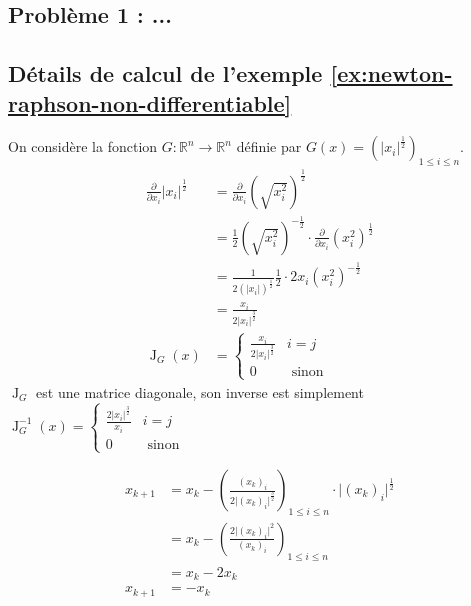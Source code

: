 \documentclass[3p, twocolumn]{elsarticle}
\DeclareMathOperator{\Jacobian}{J}
\begin{document}
\subsection{Problème 1 : ...}
\cleardoublepage
\begin{appendices}
    \section{Détails de calcul de l'exemple \ref{ex:newton-raphson-non-differentiable}}
    \label{ap:calcul-exemple-nr}
    On considère la fonction $G:\mathbb R^n\rightarrow \mathbb R^n$ définie par $G(x)=\left(\lvert x_i\rvert^{\frac12}\right)_{1\leq i\leq n}$.
    \begin{align*}
        \frac{\partial}{\partial x_i}\lvert x_i\rvert^{\frac12} & = \frac{\partial}{\partial x_i}\left(\sqrt{x_i^2}\right)^{\frac12}                                          \\
                                                                & = \frac12\left(\sqrt{x_i^2}\right)^{-\frac12}\cdot\frac{\partial}{\partial x_i}\left(x_i^2\right)^{\frac12} \\
                                                                & = \frac1{2(\lvert x_i\rvert)^{\frac12}}\frac12\cdot2x_i(x_i^2)^{-\frac12}                                   \\
                                                                & = \frac{x_i}{2\lvert x_i\rvert^{\frac32}}                                                                   \\
        \Jacobian_G(x)                                          & = \begin{cases}
            \frac{x_i}{2\lvert x_i\rvert^{\frac32}} & i=j             \\
            0                                       & \textrm{ sinon}
        \end{cases}
    \end{align*}
    $\Jacobian_G$ est une matrice diagonale, son inverse est simplement $\Jacobian^{-1}_G(x)=\begin{cases}\frac{2\lvert x_i\rvert^{\frac32}}{x_i}&i=j\\0&\textrm{ sinon}\end{cases}$

    \begin{align*}
        x_{k+1} & = x_k - \left(\frac{(x_k)_i}{2\lvert (x_k)_i\rvert^{\frac32}}\right)_{1\leq i\leq n}\cdot \lvert (x_k)_i\vert ^{\frac12} \\
                & = x_k - \left(\frac{2\lvert (x_k)_i \rvert^{2}}{(x_k)_i}\right)_{1\leq i\leq n}                                          \\
                & = x_k - 2x_k                                                                                                             \\
        x_{k+1} & = - x_k
    \end{align*}
\end{appendices}

\cleardoublepage
\nocite{*}


{}
\end{document}
